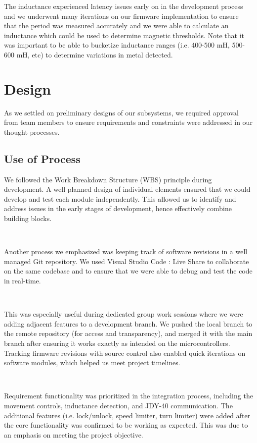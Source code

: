 \documentclass{article}
\begin{document}
The inductance experienced latency issues early on in the development process and we underwent many iterations on our
firmware implementation to ensure that the period was measured accurately and we were able to calculate an inductance which could be
used to determine magnetic thresholds. Note that it was important to be able to bucketize inductance ranges
(i.e. 400-500 mH, 500-600 mH, etc) to determine variations in metal detected.

\section{Design}

As we settled on preliminary designs of our subsystems, we required approval from team members to ensure requirements and constraints
were addressed in our thought processes.

\subsection{Use of Process}

We followed the Work Breakdown Structure (WBS) principle during development. A well planned design of individual elements ensured that we could
develop and test each module independently. This allowed us to identify and address issues in the early stages of development, hence
effectively combine building blocks.

\

Another process we emphasized was keeping track of software revisions in a well managed Git repository. We used Visual Studio Code : Live Share
to collaborate on the same codebase and to ensure that we were able to debug and test the code in real-time.

\

This was especially useful during dedicated group work sessions where we were adding adjacent features to a development branch.
We pushed the local branch to the remote repository (for access and transparency), and merged it with the main branch after ensuring it works
exactly as intended on the microcontrollers. Tracking firmware revisions with source control also enabled quick iterations on software modules,
which helped us meet project timelines.

\

Requirement functionality was prioritized in the integration process, including the movement controls, inductance detection, and JDY-40 communication.
The additional features (i.e. lock/unlock, speed limiter, turn limiter) were added after the core functionality was confirmed to be working as expected. This was due to an emphasis
on meeting the project objective.
\end{document}
